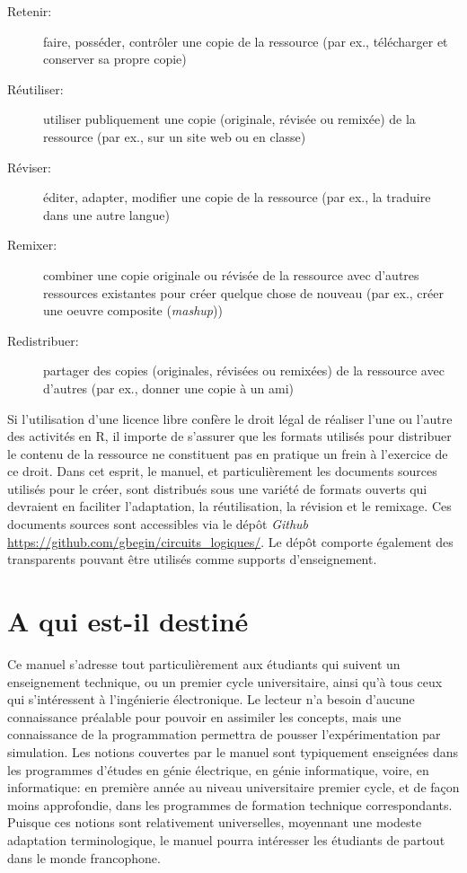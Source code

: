 \documentclass[letter, oneside]{book}
\begin{document}
\begin{description}
\item[{Retenir:}] faire, posséder, contrôler une copie de la ressource
(par ex., télécharger et conserver sa propre copie)

\item[{Réutiliser:}] utiliser publiquement une copie (originale, révisée
ou remixée) de la ressource (par ex., sur un site web ou en classe)

\item[{Réviser:}] éditer, adapter, modifier une copie de la ressource
(par ex., la traduire dans une autre langue)

\item[{Remixer:}] combiner une copie originale ou révisée de la ressource
avec d'autres ressources existantes pour créer quelque chose de
nouveau (par ex., créer une oeuvre composite (\emph{mashup}))

\item[{Redistribuer:}] partager des copies (originales, révisées ou
remixées) de la ressource avec d'autres (par ex., donner une copie à
un ami)
\end{description}

Si l'utilisation d'une licence libre confère le droit légal de
réaliser l'une ou l'autre des activités en R, il importe de s'assurer
que les formats utilisés pour distribuer le contenu de la ressource ne
constituent pas en pratique un frein à l'exercice de ce droit.  Dans
cet esprit, le manuel, et particulièrement les documents sources
utilisés pour le créer, sont distribués sous une variété de formats
ouverts qui devraient en faciliter l'adaptation, la réutilisation, la
révision et le remixage.  Ces documents sources sont accessibles via
le dépôt \emph{Github} \url{https://github.com/gbegin/circuits\_logiques/}. Le dépôt
comporte également des transparents pouvant être utilisés comme
supports d'enseignement.

\section*{A qui est-il destiné}
\label{sec:orgb03d918}

Ce manuel s'adresse tout particulièrement aux étudiants qui suivent un
enseignement technique, ou un premier cycle universitaire, ainsi qu'à
tous ceux qui s'intéressent à l'ingénierie électronique.  Le lecteur
n'a besoin d'aucune connaissance préalable pour pouvoir en assimiler
les concepts, mais une connaissance de la programmation permettra de
pousser l'expérimentation par simulation.  Les notions couvertes par
le manuel sont typiquement enseignées dans les programmes d'études en
génie électrique, en génie informatique, voire, en informatique: en
première année au niveau universitaire premier cycle, et de façon
moins approfondie, dans les programmes de formation technique
correspondants. Puisque ces notions sont relativement universelles,
moyennant une modeste adaptation terminologique, le manuel pourra
intéresser les étudiants de partout dans le monde francophone.
\end{document}
